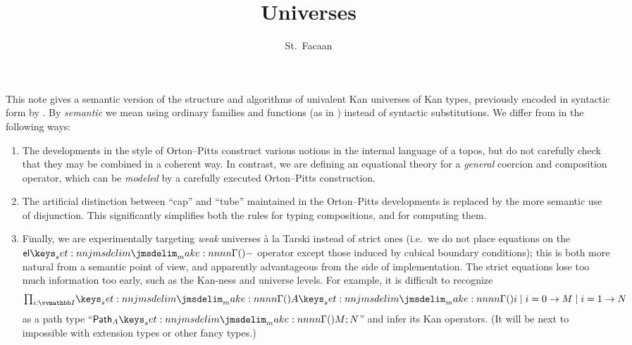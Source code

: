 \documentclass[draft]{amsart}
\title{Universes}
\author{St.~Facaan}
\begin{document}
\maketitle

This note gives a semantic version of the structure and algorithms of univalent
Kan universes of Kan types, previously encoded in syntactic form by
\citet{angiuli:2019}. By \emph{semantic} we mean using ordinary families and
functions (as in \citep{orton-pitts:2016,abcfhl:2019}) instead of syntactic
substitutions. We differ from \citep{orton-pitts:2016,abcfhl:2019} in the
following ways:

\begin{enumerate}

  \item The developments in the style of Orton--Pitts construct various notions
    in the internal language of a topos, but do not carefully check that they
    may be combined in a coherent way. In contrast, we are defining an
    equational theory for a \emph{general} coercion and composition operator,
    which can be \emph{modeled} by a carefully executed Orton--Pitts
    construction.

  \item The artificial distinction between ``cap'' and ``tube'' maintained in
    the Orton--Pitts developments is replaced by the more semantic use of
    disjunction. This significantly simplifies both the rules for typing
    compositions, and for computing them.

  \item Finally, we are experimentally targeting \emph{weak} universes \`a la
    Tarski instead of strict ones (i.e.\ we do not place equations on the
    $\TpEl{-}$ operator except those induced by cubical boundary conditions);
    this is both more natural from a semantic point of view, and apparently
    advantageous from the side of implementation.
    The strict equations lose too much information too early, such as the Kan-ness
    and universe levels. For example, it is difficult to recognize
    \[
      \Prod{i:\DIM}{\prn{A\prn{i} \mid i=0 \to M \mid i=1 \to N}}
    \]
    as a path type ``$\TpPath{A}{M}{N}$'' and infer its Kan operators.
    (It will be next to impossible with extension types or other fancy types.)

\end{enumerate}
\end{document}
